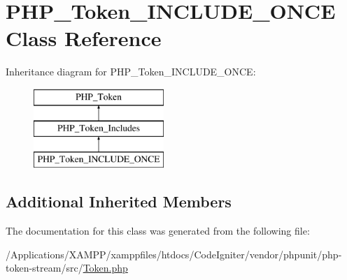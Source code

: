 \hypertarget{class_p_h_p___token___i_n_c_l_u_d_e___o_n_c_e}{}\section{P\+H\+P\+\_\+\+Token\+\_\+\+I\+N\+C\+L\+U\+D\+E\+\_\+\+O\+N\+CE Class Reference}
\label{class_p_h_p___token___i_n_c_l_u_d_e___o_n_c_e}
Inheritance diagram for P\+H\+P\+\_\+\+Token\+\_\+\+I\+N\+C\+L\+U\+D\+E\+\_\+\+O\+N\+CE\+:\begin{figure}[H]
\begin{center}
\leavevmode
\includegraphics[height=3.000000cm]{class_p_h_p___token___i_n_c_l_u_d_e___o_n_c_e}
\end{center}
\end{figure}
\subsection*{Additional Inherited Members}


The documentation for this class was generated from the following file\+:\begin{DoxyCompactItemize}
\item 
/\+Applications/\+X\+A\+M\+P\+P/xamppfiles/htdocs/\+Code\+Igniter/vendor/phpunit/php-\/token-\/stream/src/\mbox{\hyperlink{_token_8php}{Token.\+php}}\end{DoxyCompactItemize}
